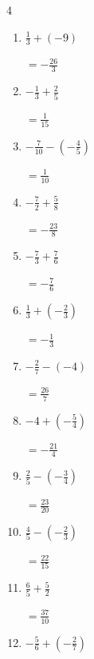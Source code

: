 \begin{multicols}{4}
\begin{enumerate}
        $\displaystyle =-\frac{17}{10}$

  \item $\displaystyle \frac{1}{3} + \left(-9\right)$

        $\displaystyle =-\frac{26}{3}$

  \item $\displaystyle -\frac{1}{3} + \frac{2}{5}$

        $\displaystyle =\frac{1}{15}$

  \item $\displaystyle -\frac{7}{10} - \left(-\frac{4}{5}\right)$

        $\displaystyle =\frac{1}{10}$

\columnbreak %

  \item $\displaystyle -\frac{7}{2} + \frac{5}{8}$

        $\displaystyle =-\frac{23}{8}$

  \item $\displaystyle -\frac{7}{3} + \frac{7}{6}$

        $\displaystyle =-\frac{7}{6}$

  \item $\displaystyle \frac{1}{3} + \left(-\frac{2}{3}\right)$

        $\displaystyle =-\frac{1}{3}$

  \item $\displaystyle -\frac{2}{7} - \left(-4\right)$

        $\displaystyle =\frac{26}{7}$

  \item $\displaystyle -4 + \left(-\frac{5}{4}\right)$

        $\displaystyle =-\frac{21}{4}$

  \item $\displaystyle \frac{2}{5} - \left(-\frac{3}{4}\right)$

        $\displaystyle =\frac{23}{20}$

  \item $\displaystyle \frac{4}{5} - \left(-\frac{2}{3}\right)$

        $\displaystyle =\frac{22}{15}$

  \item $\displaystyle \frac{6}{5} + \frac{5}{2}$

        $\displaystyle =\frac{37}{10}$

  \item $\displaystyle -\frac{5}{6} + \left(-\frac{2}{7}\right)$


\end{enumerate}
\end{multicols}
